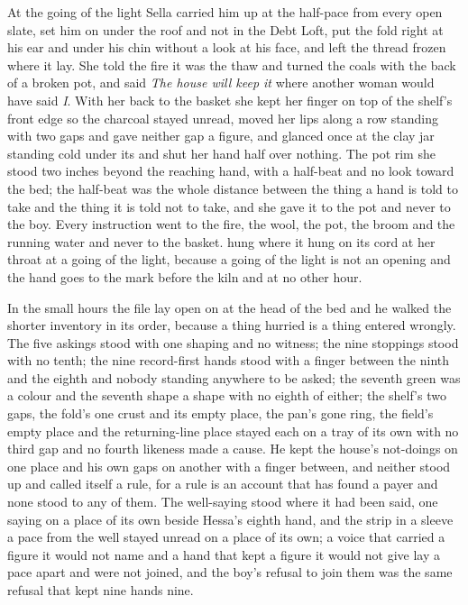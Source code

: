 At the going of the light Sella carried him up at the half-pace from every open slate, set him on  under the roof and not in the Debt Loft, put the fold right at his ear and under his chin without a look at his face, and left the thread frozen where it lay. She told the fire it was the thaw and turned the coals with the back of a broken pot, and said \emph{The house will keep it} where another woman would have said \emph{I}. With her back to the basket she kept her finger on top of the shelf's front edge so the charcoal stayed unread, moved her lips along a row standing with two gaps and gave neither gap a figure, and glanced once at the clay jar standing cold under its  and shut her hand half over nothing. The pot rim she stood two inches beyond the reaching hand, with a half-beat and no look toward the bed; the half-beat was the whole distance between the thing a hand is told to take and the thing it is told not to take, and she gave it to the pot and never to the boy. Every instruction went to the fire, the wool, the pot, the broom and the running water and never to the basket.  hung where it hung on its cord at her throat at a going of the light, because a going of the light is not an opening and the hand goes to the mark before the kiln and at no other hour.

In the small hours the file lay open on  at the head of the bed and he walked the shorter inventory in its order, because a thing hurried is a thing entered wrongly. The five askings stood with one shaping and no witness; the nine stoppings stood with no tenth; the nine record-first hands stood with a finger between the ninth and the eighth and nobody standing anywhere to be asked; the seventh green was a colour and the seventh shape a shape with no eighth of either; the shelf's two gaps, the fold's one crust and its empty place, the pan's gone ring, the field's empty place and the returning-line place stayed each on a tray of its own with no third gap and no fourth likeness made a cause. He kept the house's not-doings on one place and his own gaps on another with a finger between, and neither stood up and called itself a rule, for a rule is an account that has found a payer and none stood to any of them. The well-saying stood where it had been said, one saying on a place of its own beside Hessa's eighth hand, and the strip in a sleeve a pace from the well stayed unread on a place of its own; a voice that carried a figure it would not name and a hand that kept a figure it would not give lay a pace apart and were not joined, and the boy's refusal to join them was the same refusal that kept nine hands nine.

